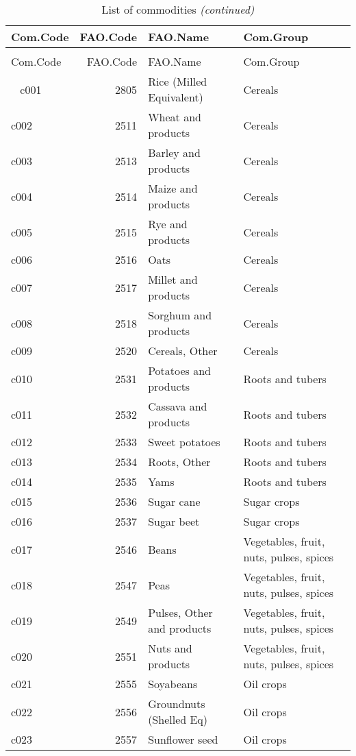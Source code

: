 \documentclass[]{article}
\begin{document}
\begin{longtable}[t]{lrll}
\caption{\label{tab:table1}List of commodities}\\
\toprule
Com.Code & FAO.Code & FAO.Name & Com.Group\\
\midrule
\endfirsthead
\caption[]{List of commodities \textit{(continued)}}\\
\toprule
Com.Code & FAO.Code & FAO.Name & Com.Group\\
\midrule
\endhead
\
\endfoot
\bottomrule
\endlastfoot
c001 & 2805 & Rice (Milled Equivalent) & Cereals\\
c002 & 2511 & Wheat and products & Cereals\\
c003 & 2513 & Barley and products & Cereals\\
c004 & 2514 & Maize and products & Cereals\\
c005 & 2515 & Rye and products & Cereals\\
\addlinespace
c006 & 2516 & Oats & Cereals\\
c007 & 2517 & Millet and products & Cereals\\
c008 & 2518 & Sorghum and products & Cereals\\
c009 & 2520 & Cereals, Other & Cereals\\
c010 & 2531 & Potatoes and products & Roots and tubers\\
\addlinespace
c011 & 2532 & Cassava and products & Roots and tubers\\
c012 & 2533 & Sweet potatoes & Roots and tubers\\
c013 & 2534 & Roots, Other & Roots and tubers\\
c014 & 2535 & Yams & Roots and tubers\\
c015 & 2536 & Sugar cane & Sugar crops\\
\addlinespace
c016 & 2537 & Sugar beet & Sugar crops\\
c017 & 2546 & Beans & Vegetables, fruit, nuts, pulses, spices\\
c018 & 2547 & Peas & Vegetables, fruit, nuts, pulses, spices\\
c019 & 2549 & Pulses, Other and products & Vegetables, fruit, nuts, pulses, spices\\
c020 & 2551 & Nuts and products & Vegetables, fruit, nuts, pulses, spices\\
\addlinespace
c021 & 2555 & Soyabeans & Oil crops\\
c022 & 2556 & Groundnuts (Shelled Eq) & Oil crops\\
c023 & 2557 & Sunflower seed & Oil crops\\

\end{longtable}
\end{document}
